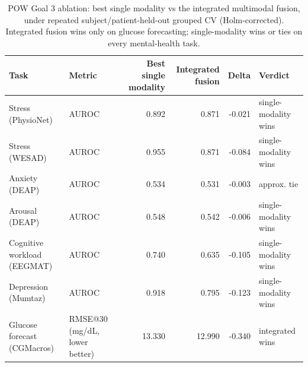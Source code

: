 \begin{table}[t]
\centering
\footnotesize
\caption{POW Goal 3 ablation: best single modality vs the integrated multimodal fusion, under repeated subject/patient-held-out grouped CV (Holm-corrected). Integrated fusion wins only on glucose forecasting; single-modality wins or ties on every mental-health task.}
\label{tab:comparative}
\begin{tabular}{llrrrl}
\toprule
Task & Metric & Best single modality & Integrated fusion & Delta & Verdict \\
\midrule
Stress (PhysioNet) & AUROC & 0.892 & 0.871 & -0.021 & single-modality wins \\
Stress (WESAD) & AUROC & 0.955 & 0.871 & -0.084 & single-modality wins \\
Anxiety (DEAP) & AUROC & 0.534 & 0.531 & -0.003 & approx. tie \\
Arousal (DEAP) & AUROC & 0.548 & 0.542 & -0.006 & single-modality wins \\
Cognitive workload (EEGMAT) & AUROC & 0.740 & 0.635 & -0.105 & single-modality wins \\
Depression (Mumtaz) & AUROC & 0.918 & 0.795 & -0.123 & single-modality wins \\
Glucose forecast (CGMacros) & RMSE@30 (mg/dL, lower better) & 13.330 & 12.990 & -0.340 & integrated wins \\
\bottomrule
\end{tabular}
\end{table}
